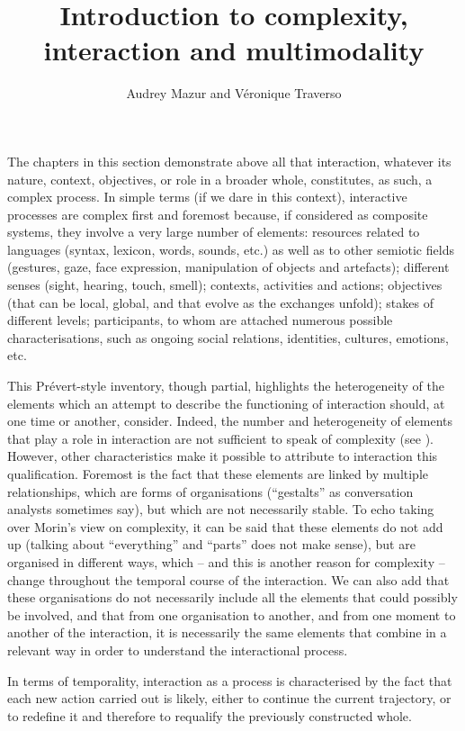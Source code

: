 \documentclass[output=paper]{langscibook}
\author{Audrey Mazur\affiliation{UMR 5161 ICAR; Centre National de la Recherche Scientifique; Ecole Normale Supérieure; Université Lumière Lyon 2}
        and Véronique Traverso\affiliation{UMR 5161 ICAR; Centre National de la Recherche Scientifique; Ecole Normale Supérieure; Université Lumière Lyon 2}}
\title{Introduction to complexity, interaction and multimodality}
\begin{document}
\maketitle 


The chapters in this section demonstrate above all that interaction, whatever its nature, context, objectives, or role in a broader whole, constitutes, as such, a complex process. In simple terms (if we dare in this context), interactive processes are complex first and foremost because, if considered as composite systems, they involve a very large number of elements: resources related to languages (syntax, lexicon, words, sounds, etc.) as well as to other semiotic fields (gestures, gaze, face expression, manipulation of objects and artefacts); different senses (sight, hearing, touch, smell); contexts, activities and actions; objectives (that can be local, global, and that evolve as the exchanges unfold); stakes of different levels; participants, to whom are attached numerous possible characterisations, such as ongoing social relations, identities, cultures, emotions, etc.

This Prévert-style inventory, though partial, highlights the heterogeneity of the elements which an attempt to describe the functioning of interaction should, at one time or another, consider. Indeed, the number and heterogeneity of elements that play a role in interaction are not sufficient to speak of complexity (see ). However, other characteristics make it possible to attribute to interaction this qualification. Foremost is the fact that these elements are linked by multiple relationships, which are forms of organisations (“gestalts” as conversation analysts sometimes say), but which are not necessarily stable. To echo \citet{Genelot2014} taking over Morin's view on complexity, it can be said that these elements do not add up (talking about “everything” and “parts” does not make sense), but are organised in different ways, which – and this is another reason for complexity – change throughout the temporal course of the interaction. We can also add that these organisations do not necessarily include all the elements that could possibly be involved, and that from one organisation to another, and from one moment to another of the interaction, it is necessarily the same elements that combine in a relevant way in order to understand the interactional process.

In terms of temporality, interaction as a process is characterised by the fact that each new action carried out is likely, either to continue the current trajectory, or to redefine it and therefore to requalify the previously constructed whole.
\end{document}
